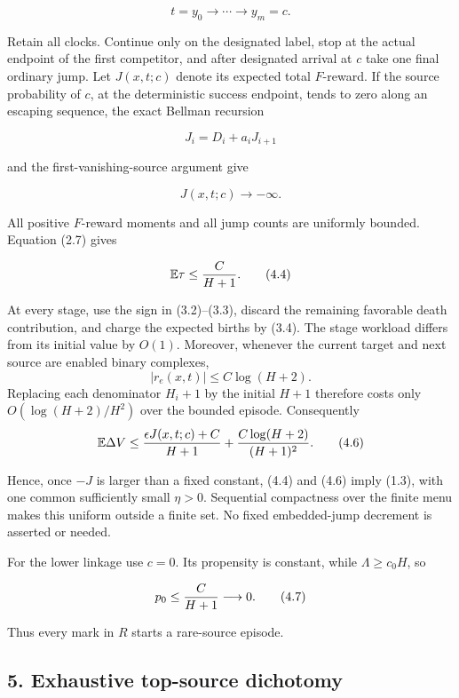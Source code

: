 \[
                    t=y_0\longrightarrow\cdots\longrightarrow y_m=c. \tag{4.1}
\]

Retain all clocks. Continue only on the designated label, stop at the
actual endpoint of the first competitor, and after designated arrival at
\(c\) take one final ordinary jump. Let \(J(x,t;c)\) denote its expected
total \(F\)-reward. If the source probability of \(c\), at the
deterministic success endpoint, tends to zero along an escaping
sequence, the exact Bellman recursion

\[
                         J_i=D_i+a_iJ_{i+1}             \tag{4.2}
\]

and the first-vanishing-source argument give

\[
                            J(x,t;c)\longrightarrow-\infty. \tag{4.3}
\]

All positive \(F\)-reward moments and all jump counts are uniformly
bounded. Equation (2.7) gives

\[
                     \mathbb E\tau\le {C\over H+1}.    \tag{4.4}
\]

At every stage, use the sign in (3.2)--(3.3), discard the remaining
favorable death contribution, and charge the expected births by (3.4).
The stage workload differs from its initial value by \(O(1)\). Moreover,
whenever the current target and next source are enabled binary
complexes, \[
                         |r_e(x,t)|\le C\log(H+2).      \tag{4.5}
\] Replacing each denominator \(H_i+1\) by the initial \(H+1\) therefore
costs only \(O(\log(H+2)/H^2)\) over the bounded episode. Consequently
\[
 \mathbb E\Delta V
 \le {\epsilon J(x,t;c)+C\over H+1}
        +{C\log(H+2)\over(H+1)^2}.                     \tag{4.6}
\]

Hence, once \(-J\) is larger than a fixed constant, (4.4) and (4.6)
imply (1.3), with one common sufficiently small \(\eta>0\). Sequential
compactness over the finite menu makes this uniform outside a finite
set. No fixed embedded-jump decrement is asserted or needed.

For the lower linkage use \(c=0\). Its propensity is constant, while
\(\Lambda\ge c_0H\), so

\[
                              p_0\le {C\over H+1}\longrightarrow0. \tag{4.7}
\]

Thus every mark in \(R\) starts a rare-source episode.

\subsection{5. Exhaustive top-source
dichotomy}

